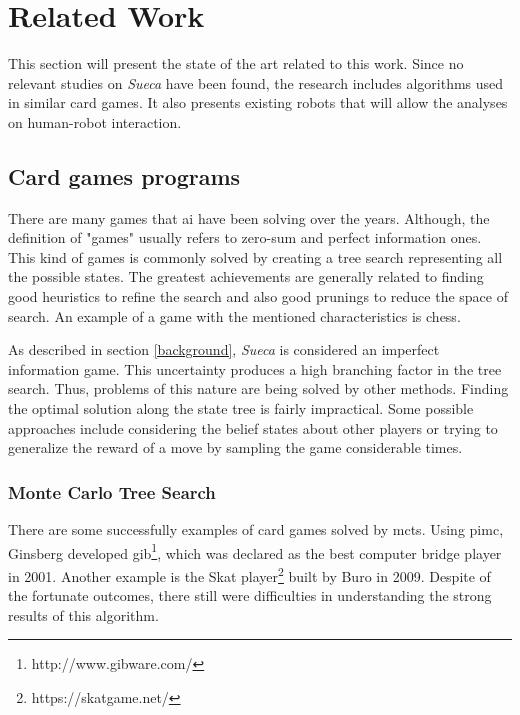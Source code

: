 \section{Related Work} \label{relatedwork}

This section will present the state of the art related to this work.
Since no relevant studies on \emph{Sueca} have been found, the research includes algorithms used in similar card games.
It also presents existing robots that will allow the analyses on human-robot interaction.



\subsection{Card games programs}
 
There are many games that \gls{ai} have been solving over the years.
Although, the definition of "games" usually refers to zero-sum and perfect information ones.
This kind of games is commonly solved by creating a tree search representing all the possible states.
The greatest achievements are generally related to finding good heuristics to refine the search and also good prunings to reduce the space of search.
An example of a game with the mentioned characteristics is chess.


As described in section \ref{background}, \emph{Sueca} is considered an imperfect information game.
This uncertainty produces a high branching factor in the tree search.
Thus, problems of this nature are being solved by other methods.
Finding the optimal solution along the state tree is fairly impractical.
Some possible approaches include considering the belief states about other players or trying to generalize the reward of a move by sampling the game considerable times.



\subsubsection{Monte Carlo Tree Search}


There are some successfully examples of card games solved by \gls{mcts}.
Using \gls{pimc}, Ginsberg developed \gls{gib}\footnote{http://www.gibware.com/}, which was declared as the best computer bridge player in 2001.
Another example is the Skat player\footnote{https://skatgame.net/} built by Buro in 2009.
Despite of the fortunate outcomes, there still were difficulties in understanding the strong results of this algorithm.


